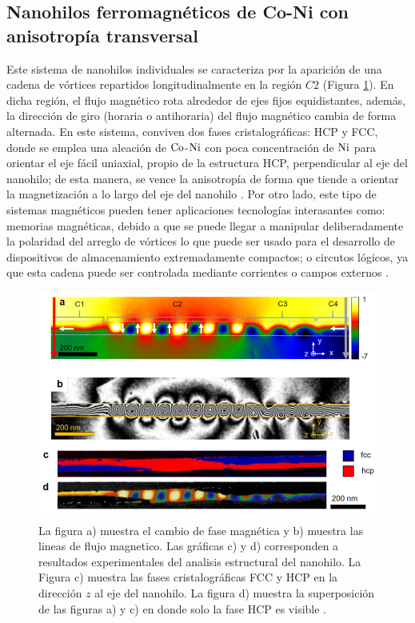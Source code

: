 \subsection{Nanohilos ferromagnéticos de Co-Ni con anisotropía transversal}
Este sistema de nanohilos individuales se caracteriza por la aparición de una cadena de vórtices repartidos longitudinalmente en la región $C2$ (Figura \ref{fig:ExoticVortexNW}). En dicha región, el flujo magnético rota alrededor de ejes fijos equidistantes, además, la dirección de giro (horaria o antihoraria) del flujo magnético cambia de forma alternada. En este sistema, conviven dos fases cristalográficas: HCP y FCC, donde se emplea una aleación de $\ce{Co}$-$\ce{Ni}$ con poca concentración de $\ce{Ni}$ para orientar el eje fácil uniaxial, propio de la estructura HCP, perpendicular al eje del nanohilo; de esta manera, se vence la anisotropía de forma que tiende a orientar la magnetización a lo largo del eje del nanohilo \cite{ExoticMagneticConfiguration}. Por otro lado, este tipo de sistemas magnéticos pueden tener aplicaciones tecnologías interasantes como: memorias magnéticas, debido a que se puede llegar a manipular deliberadamente la polaridad del arreglo de vórtices lo que puede ser usado para el desarrollo de dispositivos de almacenamiento extremadamente compactos; o circutos lógicos, ya que esta cadena puede ser controlada mediante corrientes o campos externos \cite{FieldTuneble}.
\begin{figure}[!hpt]
    \centering
    \includegraphics[scale=0.7]{Figuras/ExoticVortexNW.png}
    \renewcommand{\figurename}{\textbf{Figura}}
    \renewcommand\thefigure{\textbf{\arabic{figure}}}
    \caption{La figura a) muestra el cambio de fase magnética y b) muestra las lineas de flujo magnetico. Las gráficas c) y d) corresponden a resultados experimentales del analisis estructural del nanohilo. La Figura c) muestra las fases cristalográficas FCC y HCP en la dirección $z$ al eje del nanohilo. La figura d) muestra la superposición de las figuras a) y c) en donde solo la fase HCP es visible \cite{ExoticMagneticConfiguration}.}
    \label{fig:ExoticVortexNW}
\end{figure}